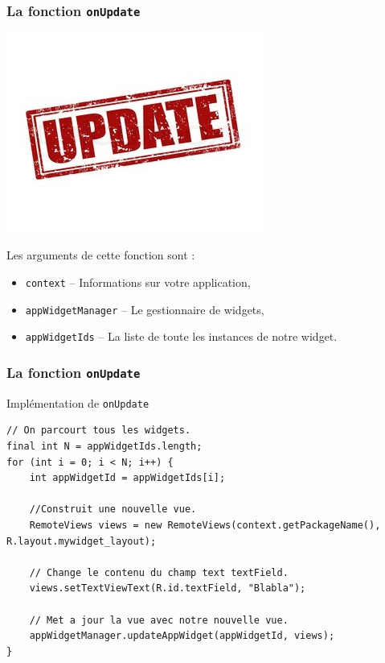 \documentclass{beamer}
\begin{document}
\begin{frame}[fragile]
\frametitle{La fonction \verb!onUpdate!}
\begin{center}
\includegraphics[scale=1]{update.jpg}
\end{center}
\begin{block}{Les arguments de cette fonction sont :}
\begin{itemize}
\item[] {\color{blue} \verb!context!} -- Informations sur votre application,
\item[] {\color{blue} \verb!appWidgetManager!} -- Le gestionnaire de widgets,
\item[] {\color{blue} \verb!appWidgetIds!} -- La liste de toute les instances de notre widget.
\end{itemize}
\end{block}
\end{frame}

\begin{frame}[fragile]
\frametitle{La fonction \verb!onUpdate!}
\begin{block}{Implémentation de \verb!onUpdate!}
\lstset{language=java}
\begin{lstlisting}
// On parcourt tous les widgets.
final int N = appWidgetIds.length;
for (int i = 0; i < N; i++) {
    int appWidgetId = appWidgetIds[i];

    //Construit une nouvelle vue.
    RemoteViews views = new RemoteViews(context.getPackageName(), R.layout.mywidget_layout);

    // Change le contenu du champ text textField.
    views.setTextViewText(R.id.textField, "Blabla");

    // Met a jour la vue avec notre nouvelle vue.
    appWidgetManager.updateAppWidget(appWidgetId, views);
}
\end{lstlisting}
\end{block}
\end{frame}
\end{document}
